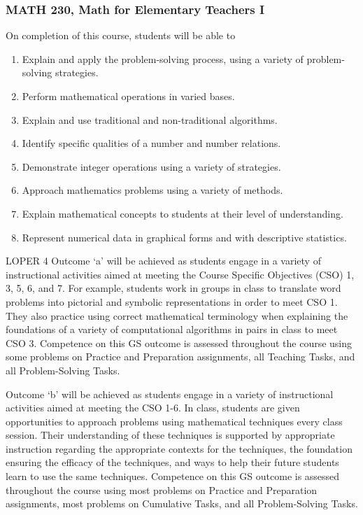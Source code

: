 \documentclass[11pt]{article}
\newenvironment{alphalist}{
\begin{enumerate}[label=(\arabic*),widest=107 ,leftmargin=25pt, itemsep=0pt]}
{\end{enumerate}}
\begin{document}
 \subsubsection{MATH 230, Math for Elementary Teachers I} 
 
 On completion of this course, students will be able to
 \begin{alphalist}

    \item Explain and apply the problem-solving process, using a variety of problem-solving strategies. 

    \item Perform mathematical operations in varied bases. 

    \item Explain and use traditional and non-traditional algorithms. 

    \item Identify specific qualities of a number and number relations. 

    \item Demonstrate integer operations using a variety of strategies. 

    \item Approach mathematics problems using a variety of methods. 

    \item Explain mathematical concepts to students at their level of understanding. 

    \item Represent numerical data in graphical forms and with descriptive statistics. 
 \end{alphalist}

 LOPER 4 Outcome `a' will be achieved as students 
 engage in a variety of instructional activities aimed at meeting 
 the Course Specific Objectives (CSO) 1, 3, 5, 6, and 7. For example, 
 students work in groups in class to translate word problems into 
 pictorial and symbolic representations in order to meet CSO 1. 
 They also practice using correct mathematical terminology when 
 explaining the foundations of a variety of computational algorithms 
 in pairs in class to meet CSO 3. Competence on this GS outcome is 
 assessed throughout the course using some problems on Practice and 
 Preparation assignments, all Teaching Tasks, and all Problem-Solving 
 Tasks.  

 

 Outcome `b' will be achieved as students engage in a variety of 
 instructional activities aimed at meeting the CSO 1-6. In class, 
 students are given opportunities to approach problems using 
 mathematical techniques every class session. Their understanding 
 of these techniques is supported by appropriate instruction 
 regarding the appropriate contexts for the techniques, the 
 foundation ensuring the efficacy of the techniques, and ways to 
 help their future students learn to use the same techniques. 
 Competence on this GS outcome is assessed throughout the course 
 using most problems on Practice and Preparation assignments, 
 most problems on Cumulative Tasks, and all Problem-Solving Tasks. 
 
\end{document}
